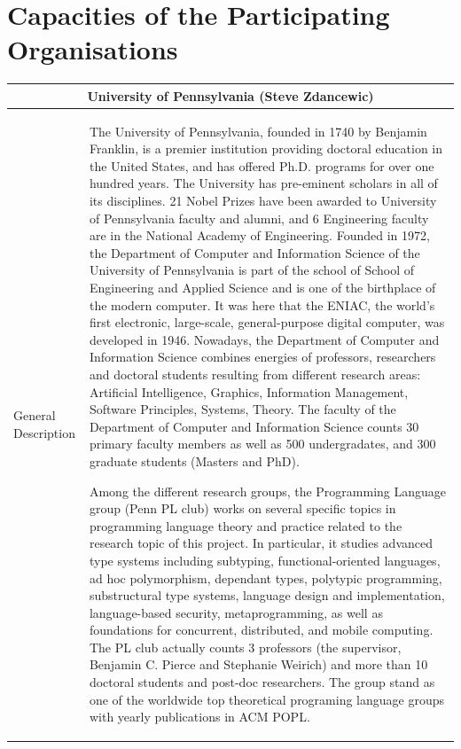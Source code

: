\documentclass{article}[11pt]
\begin{document}
\section{Capacities of the Participating Organisations}
{\footnotesize
  \begin{tabular}{| l | l |}
    \hline
    \multicolumn{2}{|c|}{University of Pennsylvania (Steve Zdancewic)}\\
    \hline
    \parbox[c]{4cm}{General Description} & 
    \parbox[c]{14cm}{The University of Pennsylvania, founded in 1740 by Benjamin Franklin, is a premier
      institution providing doctoral education in the United States, and has offered Ph.D. programs for over one hundred
      years. The University has pre-eminent scholars in all of its disciplines. 21 Nobel Prizes have been awarded to University
      of Pennsylvania faculty and alumni, and 6 Engineering faculty are in the National Academy of Engineering.
      Founded in 1972, the Department of Computer and Information Science of the University of Pennsylvania is part
      of the school of School of Engineering and Applied Science and is one of the birthplace of the modern computer. It
      was here that the ENIAC, the world’s first electronic, large-scale, general-purpose digital computer, was developed in
      1946. Nowadays, the Department of Computer and Information Science combines energies of professors, researchers and
      doctoral students resulting from different research areas: Artificial Intelligence, Graphics, Information Management,
      Software Principles, Systems, Theory. The faculty of the Department of Computer and Information Science counts 30
      primary faculty members as well as 500 undergradates, and 300 graduate students (Masters and PhD).

      Among the different research groups, the Programming Language group (Penn PL club)
      works on several specific topics in programming language theory and practice related to the research topic of this
      project. In particular, it studies advanced type systems including subtyping, functional-oriented languages, ad hoc
      polymorphism, dependant types, polytypic programming, substructural type systems, language design and implementation, language-based security, metaprogramming, as well as foundations for concurrent, distributed, and mobile
      computing.
      The PL club actually counts 3 professors (the supervisor, Benjamin C. Pierce and Stephanie Weirich) and more than
      10 doctoral students and post-doc researchers. The group stand as one of the worldwide top theoretical programing
      language groups with yearly publications in ACM POPL.

}
\end{tabular}}
\end{document}
